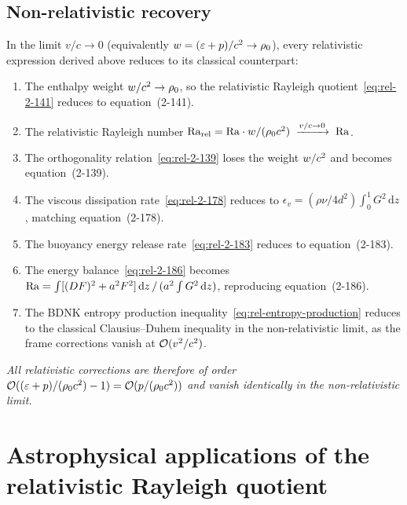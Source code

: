 \subsection{Non-relativistic recovery}\label{sec:rel-14e}

In the limit $v/c \to 0$ (equivalently
$w = (\varepsilon + p)/c^{2} \to \rho_0$), every relativistic
expression derived above reduces to its classical counterpart:

\begin{enumerate}
\item The enthalpy weight
  $w/c^2 \to \rho_0$, so the relativistic Rayleigh
  quotient~\eqref{eq:rel-2-141} reduces to equation~(2-141).

\item The relativistic Rayleigh number
  $\mathrm{Ra}_{\mathrm{rel}} = \mathrm{Ra}\cdot w/(\rho_0 c^2)
  \;\xrightarrow{v/c \to 0}\; \mathrm{Ra}$.

\item The orthogonality relation~\eqref{eq:rel-2-139} loses the
  weight $w/c^2$ and becomes equation~(2-139).

\item The viscous dissipation rate~\eqref{eq:rel-2-178} reduces to
  $\epsilon_v = (\rho\nu/4d^2)\int_0^1 G^2\,\mathrm{d}z$,
  matching equation~(2-178).

\item The buoyancy energy release rate~\eqref{eq:rel-2-183} reduces
  to equation~(2-183).

\item The energy balance~\eqref{eq:rel-2-186} becomes
  $\mathrm{Ra} = \int[(DF)^2 + a^2 F^2]\,\mathrm{d}z\,/\,
  (a^2\int G^2\,\mathrm{d}z)$,
  reproducing equation~(2-186).

\item The BDNK entropy production
  inequality~\eqref{eq:rel-entropy-production} reduces to the
  classical Clausius--Duhem inequality in the non-relativistic limit,
  as the frame corrections vanish at $\mathcal{O}(v^2/c^2)$.
\end{enumerate}

\emph{All relativistic corrections are therefore of order
$\mathcal{O}((\varepsilon + p)/(\rho_0 c^2) - 1)
= \mathcal{O}(p/(\rho_0 c^2))$
and vanish identically in the non-relativistic limit.}

\section{Astrophysical applications of the relativistic Rayleigh quotient}
\label{sec:rel-14-applications}


